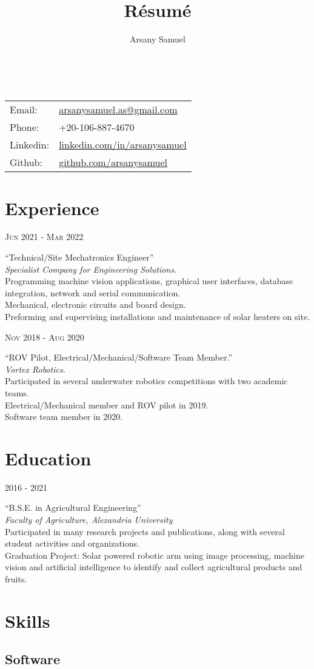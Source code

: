 \documentclass[a4paper]{article}
\title{R\'esum\'e}
\author{Arsany Samuel}
\makeatletter
\renewcommand{\maketitle}{
	\begin{center}
		{\Huge\bfseries{\theauthor}}\\
			\vspace{0.5em}
		{
			\begin{center}
				\large\begin{tabular}{l  l}
					Email: & \href{mailto:arsanysamuel.as@gmail.com}{arsanysamuel.as@gmail.com}  \\ 
					Phone: & +20-106-887-4670  \\
					Linkedin: & \href{https://linkedin.com/in/arsanysamuel}{linkedin.com/in/arsanysamuel}  \\
					Github: & \href{https://github.com/arsanysamuel}{github.com/arsanysamuel}
				\end{tabular}
			\end{center}
		}
	\end{center}
}
\newcommand{\ag}{Agricultural Engineering}
\newcommand{\foa}{Faculty of Agriculture}
\newcommand{\au}{Alexandria University}
\newcommand{\entry}[4]{   %
	\begin{center}
		\begin{minipage}[c]{0.2\linewidth}  %
			\vfill
			\hfill  %
			\textsc{#1}  %
			\vfill
		\end{minipage}
		\hfill\vline\hfill  %
		\begin{minipage}[c]{0.75\linewidth}
			\textrm{``#2''} \\
			\textit{#3} \\
			\footnotesize{#4}
		\end{minipage}
	\end{center}
}
\makeatother
\begin{document}
	\maketitle
	

	\section{Experience}
		\entry{Jun 2021 - Mar 2022}
			{Technical/Site Mechatronics Engineer}
			{Specialist Company for Engineering Solutions.}
			{Programming machine vision applications, graphical user interfaces, database integration, network and serial communication.\\Mechanical, electronic circuits and board design.\\Preforming and supervising installations and maintenance of solar heaters on site.}
		\entry{Nov 2018 - Aug 2020}
			{ROV Pilot, Electrical/Mechanical/Software Team Member.}
			{Vortex Robotics.}
			{Participated in several underwater robotics competitions with two academic teams.\\Electrical/Mechanical member and ROV pilot in 2019.\\Software team member in 2020.}

	\section{Education}
		\entry{2016 - 2021}
			{B.S.E. in \ag}
			{\foa, \au }
			{
				Participated in many research projects and publications, along with several student activities and organizations.\\
				Graduation Project: Solar powered robotic arm using image processing, machine vision and artificial intelligence to identify and collect agricultural products and fruits.
			}



	\section{Skills}
		\subsection{Software}
\end{document}
